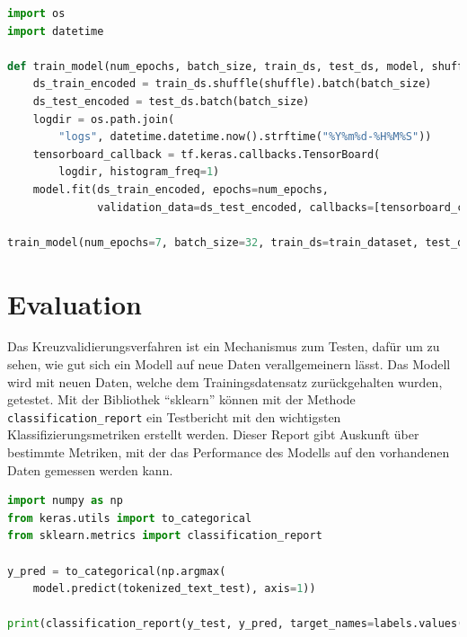 \begin{lstlisting}[language=Python,caption=Das Training des Models, label={TrainModel}]
import os
import datetime

def train_model(num_epochs, batch_size, train_ds, test_ds, model, shuffle):
    ds_train_encoded = train_ds.shuffle(shuffle).batch(batch_size)
    ds_test_encoded = test_ds.batch(batch_size)
    logdir = os.path.join(
        "logs", datetime.datetime.now().strftime("%Y%m%d-%H%M%S"))
    tensorboard_callback = tf.keras.callbacks.TensorBoard(
        logdir, histogram_freq=1)
    model.fit(ds_train_encoded, epochs=num_epochs,
              validation_data=ds_test_encoded, callbacks=[tensorboard_callback])
    
train_model(num_epochs=7, batch_size=32, train_ds=train_dataset, test_ds=test_dataset, model=model, shuffle=1000)
\end{lstlisting}





\section{Evaluation}\label{evaSec}

Das Kreuzvalidierungsverfahren ist ein Mechanismus zum Testen, dafür um zu sehen, wie gut sich ein Modell auf neue Daten verallgemeinern lässt. Das Modell wird mit neuen Daten, welche dem Trainingsdatensatz zurückgehalten wurden, getestet. Mit der Bibliothek \enquote{sklearn} können mit der Methode \texttt{classification\_report} ein Testbericht mit den wichtigsten Klassifizierungsmetriken erstellt werden. Dieser Report gibt Auskunft über bestimmte Metriken, mit der das Performance des Modells auf den vorhandenen Daten gemessen werden kann. 

\begin{lstlisting}[language=Python,caption=Das Evaluieren des Models, label={TrainModel}]
import numpy as np
from keras.utils import to_categorical
from sklearn.metrics import classification_report

y_pred = to_categorical(np.argmax(
    model.predict(tokenized_text_test), axis=1))

print(classification_report(y_test, y_pred, target_names=labels.values(), digits=4))
\end{lstlisting}



